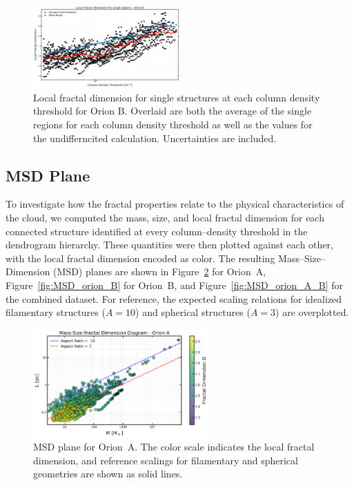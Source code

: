 \begin{figure}[t]
    \centering
    \includegraphics[width=0.5\textwidth]{figures/local_Orion_B_single_structures.png}
    \caption{Local fractal dimension for single structures at each column density threshold for Orion B. Overlaid are both the average of the single regions for each column density threshold as well as the values for the undifferncited calculation. Uncertainties are included.}
    \label{fig:local_B_single_structures}
\end{figure}

\subsection{MSD Plane}

To investigate how the fractal properties relate to the physical characteristics of the cloud, we computed the mass, size, and local fractal dimension for each connected structure identified at every column--density threshold in the dendrogram hierarchy.  
These quantities were then plotted against each other, with the local fractal dimension encoded as color.  
The resulting Mass--Size--Dimension (MSD) planes are shown in Figure~\ref{fig:MSD_orion_A} for Orion~A, Figure~\ref{fig:MSD_orion_B} for Orion~B, and Figure~\ref{fig:MSD_orion_A_B} for the combined dataset.  
For reference, the expected scaling relations for idealized filamentary structures (\(A = 10\)) and spherical structures (\(A = 3\)) are overplotted.

\begin{figure}[t]
    \centering
    \includegraphics[width=0.6\textwidth]{figures/MSD_Orion_A.png}
    \caption{MSD plane for Orion~A. The color scale indicates the local fractal dimension, and reference scalings for filamentary and spherical geometries are shown as solid lines.}
    \label{fig:MSD_orion_A}
\end{figure}

